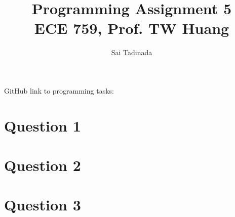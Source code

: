 \documentclass[12pt]{article}
\title{Programming Assignment 5 \\ \small{ECE 759, Prof. TW Huang}}
\author{Sai Tadinada}
\date{}
\begin{document}
\maketitle

GitHub link to programming tasks: \\ \url{}

\section{Question 1}


\section{Question 2}

\section{Question 3}
\subsection{}
\subsection{}
\subsection{}
\end{document}
